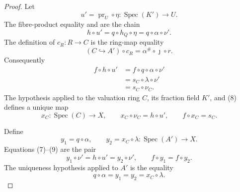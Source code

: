 \begin{proof}
  Let
  \[
    u'=\operatorname{pr}_U\circ\eta
      \colon\operatorname{Spec}(K')\to U.
  \]
  The fibre-product equality and
   are the chain
  \[
    h\circ u'
      =q\circ h_Q\circ\eta
      =q\circ\alpha\circ\nu'.                                 \tag{7}
  \]
  The definition of $c_R\colon R\to C$ is the ring-map equality
  \[
    (C\hookrightarrow A')\circ c_R
      =\alpha^\#\circ\jmath\circ r.
  \]
  Consequently
  \[
  \begin{aligned}
    f\circ h\circ u'
      &=f\circ q\circ\alpha\circ\nu'\\
      &=s_C\circ\lambda\circ\nu'\\
      &=s_C\circ\nu_C.
  \end{aligned}                                                   \tag{8}
  \]
  The hypothesis applied to the valuation ring $C$, its fraction field $K'$,
  and (8) defines a unique map
  \[
    x_C\colon\operatorname{Spec}(C)\to X,
    \qquad
    x_C\circ\nu_C=h\circ u',
    \qquad
    f\circ x_C=s_C.                                               \tag{9}
  \]

  Define
  \[
    y_1=q\circ\alpha,
    \qquad
    y_2=x_C\circ\lambda
    \colon\operatorname{Spec}(A')\to X.
  \]
  Equations (7)--(9) are the pair
  \[
    y_1\circ\nu'=h\circ u'=y_2\circ\nu',
    \qquad
    f\circ y_1=f\circ y_2.
  \]
  The uniqueness hypothesis applied to $A'$ is the equality
  \[
    q\circ\alpha=y_1=y_2=x_C\circ\lambda.                       \tag{10}
  \]


\end{proof}
